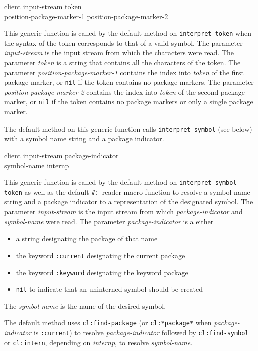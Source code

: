  {client input-stream token \\
  position-package-marker-1 position-package-marker-2}

This generic function is called by the default method on
\texttt{interpret-token} when the syntax of the token corresponds to
that of a valid symbol.  The parameter \textit{input-stream} is the
input stream from which the characters were read.  The parameter
\textit{token} is a string that contains all the characters of the
token.  The parameter \textit{position-package-marker-1} contains the
index into \textit{token} of the first package marker, or \texttt{nil}
if the token contains no package markers.  The parameter
\textit{position-package-marker-2} contains the index into
\textit{token} of the second package marker, or \texttt{nil} if the
token contains no package markers or only a single package marker.

The default method on this generic function calls
\texttt{interpret-symbol} (see below) with a symbol name string and a
package indicator.

 {client input-stream package-indicator \\
  symbol-name internp}

This generic function is called by the default method on
\texttt{interpret-symbol-token} as well as the default
\texttt{\#:}~reader macro function to resolve a symbol name string and
a package indicator to a representation of the designated symbol.  The
parameter \textit{input-stream} is the input stream from which
\textit{package-indicator} and \textit{symbol-name} were read.  The
parameter \textit{package-indicator} is a either

\begin{itemize}
\item a string designating the package of that name
\item the keyword \texttt{:current} designating the current package
\item the keyword \texttt{:keyword} designating the keyword package
\item \texttt{nil} to indicate that an uninterned symbol should be
  created
\end{itemize}

The \textit{symbol-name} is the name of the desired symbol.

The default method uses \texttt{cl:find-package} (or
\texttt{cl:*package*} when \textit{package-indicator} is
\texttt{:current}) to resolve \textit{package-indicator} followed by
\texttt{cl:find-symbol} or \texttt{cl:intern}, depending on
\textit{internp}, to resolve \textit{symbol-name}.

